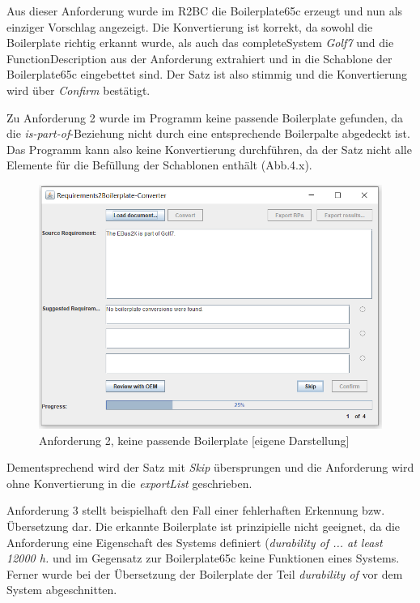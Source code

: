 \documentclass[12pt]{report}
\begin{document}
Aus dieser Anforderung wurde im R2BC die Boilerplate65c erzeugt und nun als einziger Vorschlag angezeigt. Die Konvertierung ist korrekt, da sowohl die Boilerplate richtig erkannt wurde, als auch das completeSystem \textit{Golf7} und die FunctionDescription aus der Anforderung extrahiert und in die Schablone der Boilerplate65c eingebettet sind. Der Satz ist also stimmig und die Konvertierung wird über \textit{Confirm} bestätigt. 

Zu Anforderung 2 wurde im Programm keine passende Boilerplate gefunden, da die \textit{is-part-of}-Beziehung nicht durch eine entsprechende Boilerpalte abgedeckt ist. Das Programm kann also keine Konvertierung durchführen, da der Satz nicht alle Elemente für die Befüllung der Schablonen enthält (Abb.4.x).

\begin{figure}[h!]
\begin{center}
\includegraphics[scale=0.7]{Bilder/GUI-req2.png}
\caption{Anforderung 2, keine passende Boilerplate [eigene Darstellung]}
\end{center}
\end{figure}

Dementsprechend wird der Satz mit \textit{Skip} übersprungen und die Anforderung wird ohne Konvertierung in die \textit{exportList} geschrieben.

Anforderung 3 stellt beispielhaft den Fall einer fehlerhaften Erkennung bzw. Übersetzung dar. Die erkannte Boilerplate ist prinzipielle nicht geeignet, da die Anforderung eine Eigenschaft des Systems definiert (\textit{durability of ... at least 12000 h.} und im Gegensatz zur Boilerplate65c keine Funktionen eines Systems. Ferner wurde bei der Übersetzung der Boilerplate der Teil \textit{durability of} vor dem System abgeschnitten.
\end{document}
